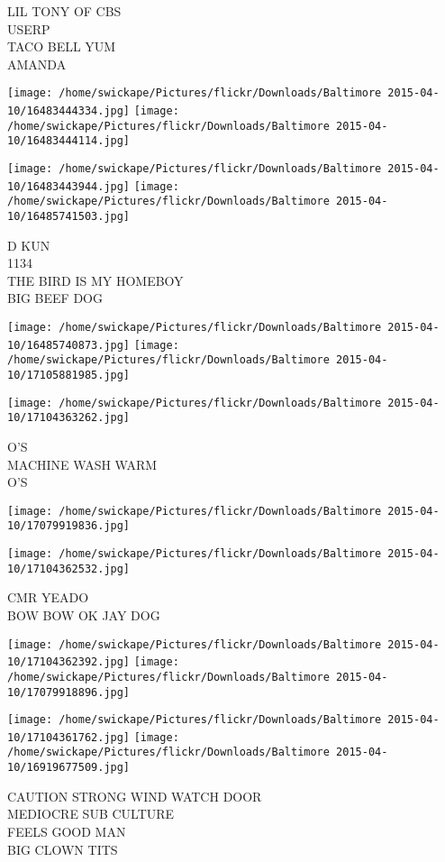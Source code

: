 \documentclass[10pt,letterpaper]{article}
\begin{document}
LIL TONY OF CBS\\
USERP\\
TACO BELL YUM\\
AMANDA\\
\pagebreak

\texttt{[image: /home/swickape/Pictures/flickr/Downloads/Baltimore 2015-04-10/16483444334.jpg]}
\texttt{[image: /home/swickape/Pictures/flickr/Downloads/Baltimore 2015-04-10/16483444114.jpg]}

\texttt{[image: /home/swickape/Pictures/flickr/Downloads/Baltimore 2015-04-10/16483443944.jpg]}
\texttt{[image: /home/swickape/Pictures/flickr/Downloads/Baltimore 2015-04-10/16485741503.jpg]}

D KUN\\
1134\\
THE BIRD IS MY HOMEBOY\\
BIG BEEF DOG\\
\pagebreak

\texttt{[image: /home/swickape/Pictures/flickr/Downloads/Baltimore 2015-04-10/16485740873.jpg]}
\texttt{[image: /home/swickape/Pictures/flickr/Downloads/Baltimore 2015-04-10/17105881985.jpg]}

\vspace{0.25in}
\texttt{[image: /home/swickape/Pictures/flickr/Downloads/Baltimore 2015-04-10/17104363262.jpg]}

O'S\\
MACHINE WASH WARM\\
O'S\\
\pagebreak

\texttt{[image: /home/swickape/Pictures/flickr/Downloads/Baltimore 2015-04-10/17079919836.jpg]}

\vspace{0.25in}
\texttt{[image: /home/swickape/Pictures/flickr/Downloads/Baltimore 2015-04-10/17104362532.jpg]}

CMR YEADO\\
BOW BOW OK JAY DOG\\
\pagebreak

\texttt{[image: /home/swickape/Pictures/flickr/Downloads/Baltimore 2015-04-10/17104362392.jpg]}
\texttt{[image: /home/swickape/Pictures/flickr/Downloads/Baltimore 2015-04-10/17079918896.jpg]}

\texttt{[image: /home/swickape/Pictures/flickr/Downloads/Baltimore 2015-04-10/17104361762.jpg]}
\texttt{[image: /home/swickape/Pictures/flickr/Downloads/Baltimore 2015-04-10/16919677509.jpg]}

CAUTION STRONG WIND WATCH DOOR\\
MEDIOCRE SUB CULTURE\\
FEELS GOOD MAN\\
BIG CLOWN TITS\\
\pagebreak
\end{document}
